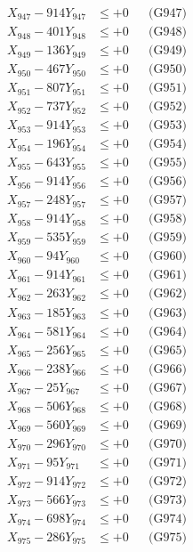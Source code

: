 \documentclass[a4paper,10pt]{article}
\begin{document}
{\begin{align}
X_{947} - 914Y_{947} &\leq +0 && \text{(G947)} \\
X_{948} - 401Y_{948} &\leq +0 && \text{(G948)} \\
X_{949} - 136Y_{949} &\leq +0 && \text{(G949)} \\
X_{950} - 467Y_{950} &\leq +0 && \text{(G950)} \\
\allowbreak
X_{951} - 807Y_{951} &\leq +0 && \text{(G951)} \\
X_{952} - 737Y_{952} &\leq +0 && \text{(G952)} \\
X_{953} - 914Y_{953} &\leq +0 && \text{(G953)} \\
X_{954} - 196Y_{954} &\leq +0 && \text{(G954)} \\
X_{955} - 643Y_{955} &\leq +0 && \text{(G955)} \\
X_{956} - 914Y_{956} &\leq +0 && \text{(G956)} \\
X_{957} - 248Y_{957} &\leq +0 && \text{(G957)} \\
X_{958} - 914Y_{958} &\leq +0 && \text{(G958)} \\
X_{959} - 535Y_{959} &\leq +0 && \text{(G959)} \\
X_{960} - 94Y_{960} &\leq +0 && \text{(G960)} \\
\allowbreak
X_{961} - 914Y_{961} &\leq +0 && \text{(G961)} \\
X_{962} - 263Y_{962} &\leq +0 && \text{(G962)} \\
X_{963} - 185Y_{963} &\leq +0 && \text{(G963)} \\
X_{964} - 581Y_{964} &\leq +0 && \text{(G964)} \\
X_{965} - 256Y_{965} &\leq +0 && \text{(G965)} \\
X_{966} - 238Y_{966} &\leq +0 && \text{(G966)} \\
X_{967} - 25Y_{967} &\leq +0 && \text{(G967)} \\
X_{968} - 506Y_{968} &\leq +0 && \text{(G968)} \\
X_{969} - 560Y_{969} &\leq +0 && \text{(G969)} \\
X_{970} - 296Y_{970} &\leq +0 && \text{(G970)} \\
\allowbreak
X_{971} - 95Y_{971} &\leq +0 && \text{(G971)} \\
X_{972} - 914Y_{972} &\leq +0 && \text{(G972)} \\
X_{973} - 566Y_{973} &\leq +0 && \text{(G973)} \\
X_{974} - 698Y_{974} &\leq +0 && \text{(G974)} \\
X_{975} - 286Y_{975} &\leq +0 && \text{(G975)} \\

\end{align}}
\end{document}
